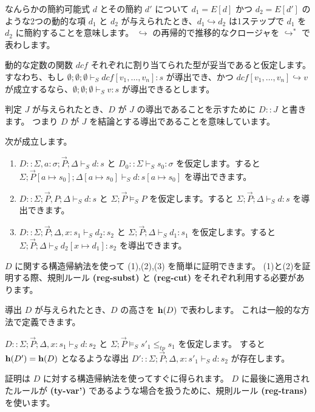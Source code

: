 \documentclass[submit,techreq,noauthor,onecolumn]{ipsj}
\begin{document}
\noindent なんらかの簡約可能式 $d$ とその簡約 $d'$ について $d_1 = E[d]$ かつ $d_2 = E[d']$ のような2つの動的な項 $d_1$ と $d_2$ が与えられたとき、$d_1 \hookrightarrow d_2$ は1ステップで $d_1$ を $d_2$ に簡約することを意味します。
$\hookrightarrow$ の再帰的で推移的なクロージャを $\hookrightarrow^*$ で表わします。

\noindent 動的な定数の関数 $dcf$ それぞれに割り当てられた型が妥当であると仮定します。
すなわち、もし $\emptyset;\emptyset;\emptyset \vdash_S dcf[v_1,\ldots,v_n]:s$ が導出でき、かつ $dcf[v_1,\ldots,v_n] \hookrightarrow v$ が成立するなら、$\emptyset;\emptyset;\emptyset \vdash_S v:s$ が導出できるとします。

判定 $J$ が与えられたとき、$D$ が $J$ の導出であることを示すために $D :: J$ と書きます。
つまり $D$ が $J$ を結論とする導出であることを意味しています。

 次が成立します。

\begin{enumerate}
  \item $D :: \Sigma,a : \sigma; \vec{P}; \Delta \vdash_S d:s$ と $D_0 :: \Sigma \vdash_S s_0 : \sigma$ を仮定します。すると $\Sigma; \vec{P}[a \mapsto s_0]; \Delta[a \mapsto s_0] \vdash_S d:s[a \mapsto s_0]$ を導出できます。
  \item $D :: \Sigma; \vec{P},P; \Delta \vdash_S d:s$ と $\Sigma; \vec{P} \models_S P$ を仮定します。すると $\Sigma; \vec{P}; \Delta \vdash_S d:s$ を導出できます。
  \item $D :: \Sigma; \vec{P}; \Delta, x:s_1 \vdash_S d_2:s_2$ と $\Sigma; \vec{P}; \Delta \vdash_S d_1:s_1$ を仮定します。すると $\Sigma; \vec{P}; \Delta \vdash_S d_2[x \mapsto d_1]:s_2$ を導出できます。
\end{enumerate}

$D$ に関する構造帰納法を使って (1),(2),(3) を簡単に証明できます。
(1)と(2)を証明する際、規則ルール {\bf (reg-subst)} と {\bf (reg-cut)} をそれぞれ利用する必要があります。

\noindent 導出 $D$ が与えられたとき、$D$ の高さを ${\bf h}(D)$ で表わします。
これは一般的な方法で定義できます。

$D :: \Sigma; \vec{P}; \Delta, x:s_1 \vdash_S d:s_2$ と $\Sigma; \vec{P} \models_S s'_1 \leq_{tp} s_1$ を仮定します。
すると ${\bf h}(D') = {\bf h}(D)$ となるような導出 $D' :: \Sigma; \vec{P}; \Delta,x:s'_1 \vdash_S d:s_2$ が存在します。

証明は $D$ に対する構造帰納法を使ってすぐに得られます。
$D$ に最後に適用されたルールが {\bf (ty-var')} であるような場合を扱うために、規則ルール {\bf (reg-trans)} を使います。
\end{document}
